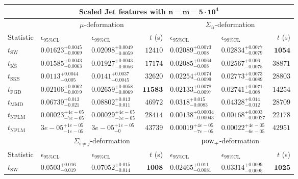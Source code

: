 \begin{tabular}{l|llr|llr}
	\toprule
	\multicolumn{7}{c}{{\bf Scaled Jet features with $\mathbf{n=m=5\cdot 10^{4}}$}} \\
	\toprule
	\multicolumn{1}{c}{} & \multicolumn{3}{c}{$\mu$-deformation} & \multicolumn{3}{c}{$\Sigma_{ii}$-deformation} \\
	Statistic & $\epsilon_{95\%\mathrm{CL}}$ & $\epsilon_{99\%\mathrm    {CL}}$ & $t$ (s) & $\epsilon_{95\%\mathrm{CL}}$ & $\epsilon_{99\%\mathrm{CL}}$ & $t$ (s) \\
	\midrule
	$t_{\mathrm{SW}}$ & $0.01623_{-0.0069}^{+0.0045}$ & $0.02098_{-0.0059}^{+0.0049}$ & $12410$ & $0.02089_{-0.008}^{+0.0073}$ & $0.02834_{-0.0079}^{+0.0077}$ & ${\mathbf{1054}}$ \\
	$t_{\overline{\mathrm{KS}}}$ & $0.01585_{-0.0063}^{+0.0043}$ & $0.01927_{-0.0056}^{+0.0043}$ & $17174$ & ${\mathbf{0.02085_{-0.008}^{+0.0064}}}$ & ${\mathbf{0.02567_{-0.0075}^{+0.006}}}$ & $38871$ \\
	$t_{\mathrm{SKS}}$ & ${\mathbf{0.0113_{-0.005}^{+0.0044}}}$ & ${\mathbf{0.0141_{-0.0045}^{+0.0037}}}$ & $32620$ & $0.02254_{-0.0099}^{+0.0074}$ & $0.02773_{-0.0089}^{+0.0073}$ & $28803$ \\
	$t_{\mathrm{FGD}}$ & $0.02106_{-0.0079}^{+0.0062}$ & $0.02659_{-0.0069}^{+0.0058}$ & ${\mathbf{11583}}$ & $0.02133_{-0.0097}^{+0.0078}$ & $0.02741_{-0.008}^{+0.0071}$ & $14254$ \\
	$t_{\mathrm{MMD}}$ & $0.06739_{-0.021}^{+0.013}$ & $0.08802_{-0.011}^{+0.013}$ & $46972$ & $0.0318_{-0.0083}^{+0.015}$ & $0.04328_{-0.012}^{+0.014}$ & $28709$ \\
\rowcolor{red!35}	$t_{\mathrm{NPLM}}$ & $0.00023_{-7e-05}^{+4e-05}$ & $0.00029_{-7e-05}^{+4e-05}$ & $28414$ & $0.00138_{-0.00043}^{+0.00034}$ & $0.00168_{-0.00027}^{+0.0003}$ & $22178$ \\
\rowcolor{blue!35}	$t_{\mathrm{NPLM}}$ & $3e-05_{-1e-05}^{+1e-05}$ & $3e-05_{-0}^{+1e-05}$ & $43739$ & $0.00019_{-7e-05}^{+4e-05}$ & $0.00022_{-6e-05}^{+4e-05}$ & $42951$ \\
	\toprule
	\multicolumn{1}{c}{} & \multicolumn{3}{c}{$\Sigma_{i\neq j}$-deformation} & \multicolumn{3}{c}{$\rm{pow}_{+}$-deformation} \\
Statistic & $\epsilon_{95\%\mathrm{CL}}$ & $\epsilon_{99\%\mathrm{CL}}$ & $t$ (s) & $\epsilon_{95\%\mathrm{CL}}$ & $\epsilon_{99\%\mathrm{CL}}$ & $t$ (s) \\
	\midrule
	$t_{\mathrm{SW}}$ & $0.0503_{-0.019}^{+0.016}$ & $0.07052_{-0.014}^{+0.015}$ & ${\mathbf{1008}}$ & $0.02465_{-0.0081}^{+0.011}$ & $0.03314_{-0.0095}^{+0.0099}$ & ${\mathbf{1025}}$ \\

\end{tabular}
